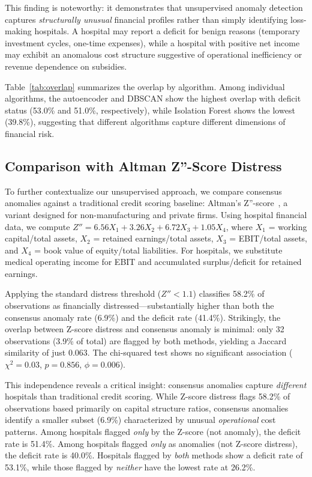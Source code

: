 \documentclass{ieeeaccess}
\begin{document}
This finding is noteworthy: it demonstrates that unsupervised anomaly detection captures \textit{structurally unusual} financial profiles rather than simply identifying loss-making hospitals. A hospital may report a deficit for benign reasons (temporary investment cycles, one-time expenses), while a hospital with positive net income may exhibit an anomalous cost structure suggestive of operational inefficiency or revenue dependence on subsidies.

Table~\ref{tab:overlap} summarizes the overlap by algorithm. Among individual algorithms, the autoencoder and DBSCAN show the highest overlap with deficit status (53.0\% and 51.0\%, respectively), while Isolation Forest shows the lowest (39.8\%), suggesting that different algorithms capture different dimensions of financial risk.

\subsection{Comparison with Altman Z''-Score Distress}
\label{subsec:zscore}

To further contextualize our unsupervised approach, we compare consensus anomalies against a traditional credit scoring baseline: Altman's Z''-score~\cite{altman2002revisiting}, a variant designed for non-manufacturing and private firms. Using hospital financial data, we compute $Z'' = 6.56 X_1 + 3.26 X_2 + 6.72 X_3 + 1.05 X_4$, where $X_1$ = working capital/total assets, $X_2$ = retained earnings/total assets, $X_3$ = EBIT/total assets, and $X_4$ = book value of equity/total liabilities. For hospitals, we substitute medical operating income for EBIT and accumulated surplus/deficit for retained earnings.

Applying the standard distress threshold ($Z'' < 1.1$) classifies 58.2\% of observations as financially distressed---substantially higher than both the consensus anomaly rate (6.9\%) and the deficit rate (41.4\%). Strikingly, the overlap between Z-score distress and consensus anomaly is minimal: only 32 observations (3.9\% of total) are flagged by both methods, yielding a Jaccard similarity of just 0.063. The chi-squared test shows no significant association ($\chi^2 = 0.03$, $p = 0.856$, $\phi = 0.006$).

This independence reveals a critical insight: consensus anomalies capture \textit{different} hospitals than traditional credit scoring. While Z-score distress flags 58.2\% of observations based primarily on capital structure ratios, consensus anomalies identify a smaller subset (6.9\%) characterized by unusual \textit{operational} cost patterns. Among hospitals flagged \textit{only} by the Z-score (not anomaly), the deficit rate is 51.4\%. Among hospitals flagged \textit{only} as anomalies (not Z-score distress), the deficit rate is 40.0\%. Hospitals flagged by \textit{both} methods show a deficit rate of 53.1\%, while those flagged by \textit{neither} have the lowest rate at 26.2\%.
\end{document}
